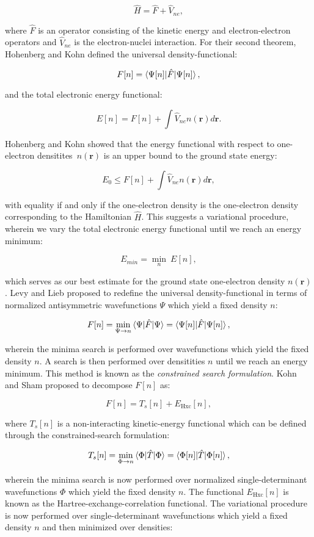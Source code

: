 $$ \hat{H} = \hat{F} + \hat{V}_{ne} , $$

where $\hat{F}$ is an operator consisting of the kinetic energy
and electron-electron operators and $\hat{V}_{ne}$
is the electron-nuclei interaction.
For their second theorem, Hohenberg and Kohn defined
the universal density-functional:

$$ F[n] = \braket{\Psi[n] | \hat{F} | \Psi[n]} , $$

and the total electronic energy functional:

$$ E[n] = F[n] + \int \hat{V}_{ne} n(\bm{r}) d\bm{r} . $$

Hohenberg and Kohn showed that the energy functional
with respect to one-electron densitites $n(\bm{r})$
is an upper bound to the ground state energy:

$$ E_0 \leq F[n] + \int \hat{V}_{ne} n(\bm{r}) d\bm{r} , $$

with equality if and only if the one-electron density
is the one-electron density corresponding to the Hamiltonian $\hat{H}$.
This suggests a variational procedure, wherein
we vary the total electronic energy functional
until we reach an energy minimum:

$$ E_{min} = \underset{n}{\min} \ E[n] , $$

which serves as our best estimate for the ground state
one-electron density $n(\bm{r})$.
Levy and Lieb \cite{levy1979universal, perdew1982density, perdew1983physical}
proposed to redefine the universal density-functional
in terms of normalized antisymmetric wavefunctions $\Psi$
which yield a fixed density $n$:

$$ F[n] = \underset{\Psi \rightarrow n}{\min}
    \braket{\Psi | \hat{F} | \Psi}
    = \braket{\Psi[n] | \hat{F} | \Psi[n]} , $$

wherein the minima search is performed over wavefunctions
which yield the fixed density $n$.
A search is then performed over densitities $n$
until we reach an energy minimum. This method
is known as the \textit{constrained search formulation}.
Kohn and Sham proposed to decompose $F[n]$ as:

$$ F[n] = T_s[n] + E_{\text{Hxc}}[n] , $$

where $T_s[n]$ is a non-interacting kinetic-energy functional
which can be defined through the constrained-search formulation:

$$ T_s[n] = \underset{\Phi \rightarrow n}{\min}
    \braket{\Phi | \hat{T} | \Phi}
    = \braket{\Phi[n] | \hat{T} | \Phi[n]} , $$

wherein the minima search is now performed over normalized
single-determinant wavefunctions $\Phi$ which yield
the fixed density $n$. The functional
$E_{\text{Hxc}}[n]$ is known as the Hartree-exchange-correlation
functional. The variational procedure is now
performed over single-determinant wavefunctions
which yield a fixed density $n$ and then
minimized over densities:

